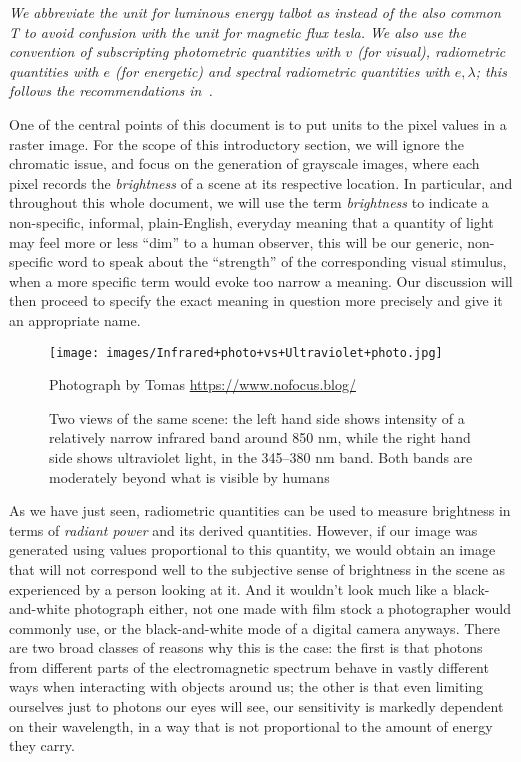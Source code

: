 \begin{sidewaystable}
{}
\vskip 1mm
{\footnotesize\it We abbreviate the unit for luminous energy \textit{talbot} as
\unit{\talbot} instead of the also common \unit{\tesla} to avoid confusion with the
unit for magnetic flux \textit{tesla}.
We also use the convention of subscripting photometric quantities
with $v$ (for \textit{visual}), radiometric quantities with $e$ (for
\textit{energetic}) and spectral radiometric quantities with $e,\lambda$;
this follows the recommendations in~\cite{iso:80000-7:2019,cie:s017.2020,iec:60050-845:2020}.}
\end{sidewaystable}


One of the central points of this document is to put units to the pixel values in a raster image. 
For the scope of this introductory section, we will ignore the chromatic issue, and focus on 
the generation of grayscale images, where each pixel records the \textsl{\gls{brightness}} of 
a scene at its respective location. 
In particular, and throughout this whole document, we will use the term \textsl{brightness} 
to indicate a non-specific, informal, plain-English, everyday meaning that a quantity of light may 
feel more or less ``dim'' to a human observer, this will be our generic, non-specific word to
speak about the ``strength'' of the corresponding visual stimulus, when a more specific term would evoke too
narrow a meaning. 
Our discussion will then proceed to specify the exact meaning in question more 
precisely and give it an appropriate name.

\begin{figure}
	{
		\hfill
		\texttt{[image: images/Infrared+photo+vs+Ultraviolet+photo.jpg]}
		\hfill
	}	

	\caption{\label{fig:uv_ir_photo}
		Two views of the same scene: the left hand side
		shows intensity of a relatively narrow infrared band around 850 \unit{\nano\meter},
		while the right hand side shows ultraviolet light, 
		in the 345--380 \unit{\nano\meter} band. 
		Both bands are moderately beyond what is visible by humans}
	{\scriptsize\hfill
		Photograph by Tomas \url{https://www.nofocus.blog/}
	}
\end{figure}

As we have just seen, radiometric quantities can be used to measure brightness in 
terms of \emph{\gls{radiant power}} and its derived quantities.
However, if our image was generated using values proportional to this quantity,
we would obtain an image that will not correspond well to the subjective 
sense of brightness in the scene as experienced by a person looking at it. 
And it wouldn't look much like a black-and-white photograph either, not one made
with film stock a photographer would commonly use, or the black-and-white mode 
of a digital camera anyways.
There are two broad classes of reasons why this is the case: 
the first is that photons from different parts of the electromagnetic spectrum
behave in vastly different ways when interacting with objects around us;
the other is that even limiting ourselves just to photons our eyes will see,
our sensitivity is markedly dependent on their wavelength, in a way that is not
proportional to the amount of energy they carry. 

